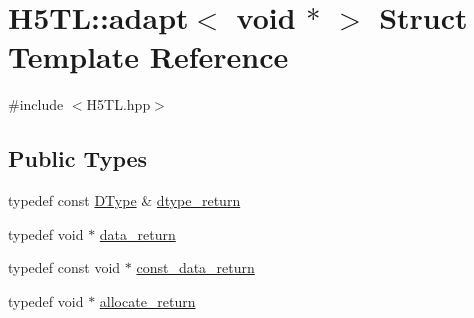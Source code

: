 \hypertarget{struct_h5_t_l_1_1adapt_3_01void_01_5_01_4}{\section{H5\-T\-L\-:\-:adapt$<$ void $\ast$ $>$ Struct Template Reference}
\label{struct_h5_t_l_1_1adapt_3_01void_01_5_01_4}
}


{\ttfamily \#include $<$H5\-T\-L.\-hpp$>$}

\subsection*{Public Types}
\begin{DoxyCompactItemize}
\item 
typedef const \hyperlink{class_h5_t_l_1_1_d_type}{D\-Type} \& \hyperlink{struct_h5_t_l_1_1adapt_3_01void_01_5_01_4_a12b8f26716992f31fd532804fe4895cc}{dtype\-\_\-return}
\item 
typedef void $\ast$ \hyperlink{struct_h5_t_l_1_1adapt_3_01void_01_5_01_4_a4c6e9d65ebdbec1d46d20fc905c4e4cb}{data\-\_\-return}
\item 
typedef const void $\ast$ \hyperlink{struct_h5_t_l_1_1adapt_3_01void_01_5_01_4_af1fde85ce8f3296282fe22e6ee5b9c46}{const\-\_\-data\-\_\-return}
\item 
typedef void $\ast$ \hyperlink{struct_h5_t_l_1_1adapt_3_01void_01_5_01_4_ae25684c819a12a21c43243c76650cb08}{allocate\-\_\-return}
\end{DoxyCompactItemize}
